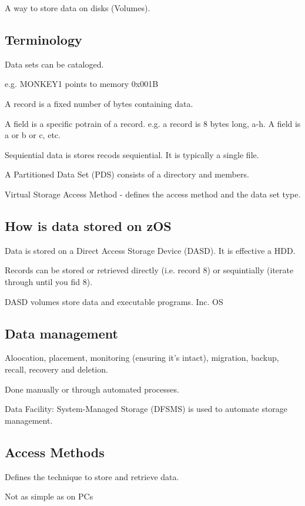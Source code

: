 \documentclass{report}
\begin{document}
A way to store data on disks (Volumes).

\subsection{Terminology}

Data sets can be cataloged.

e.g. MONKEY1 points to memory 0x001B

A record is a fixed number of bytes containing data.

A field is a specific potrain of a record. e.g. a record is 8 bytes long, a-h. A field is a or b or c, etc.

Sequiential data is stores recods sequiential. It is typically a single file.

A Partitioned Data Set (PDS) consists of a directory and members.

Virtual Storage Access Method - defines the access method and the data set type.

\subsection{How is data stored on zOS}

Data is stored on a Direct Access Storage Device (DASD). It is effective a HDD.

Records can be stored or retrieved directly (i.e. record 8) or sequintially (iterate through until you fid 8).

DASD volumes store data and executable programs. Inc. OS

\subsection{Data management}

Aloocation, placement, monitoring (ensuring it's intact), migration, backup, recall, recovery and deletion.

Done manually or through automated processes.

Data Facility: System-Managed Storage (DFSMS) is used to automate storage management.

\subsection{Access Methods}

Defines the technique to store and retrieve data.

Not as simple as on PCs
\end{document}
